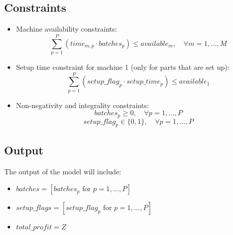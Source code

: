 \documentclass{article}
\begin{document}
\subsection*{Constraints}

\begin{itemize}
    \item Machine availability constraints:
    \[
    \sum_{p=1}^{P} (time_{m,p} \cdot batches_{p}) \leq available_{m}, \quad \forall m = 1, \ldots, M
    \]
    
    \item Setup time constraint for machine 1 (only for parts that are set up):
    \[
    \sum_{p=1}^{P} (setup\_flag_{p} \cdot setup\_time_{p}) \leq available_{1}
    \]

    \item Non-negativity and integrality constraints:
    \[
    batches_{p} \geq 0, \quad \forall p = 1, \ldots, P
    \]
    \[
    setup\_flag_{p} \in \{0, 1\}, \quad \forall p = 1, \ldots, P
    \]
\end{itemize}

\subsection*{Output}
The output of the model will include:
\begin{itemize}
    \item \( batches = [batches_{p} \text{ for } p = 1, \ldots, P] \)
    \item \( setup\_flags = [setup\_flag_{p} \text{ for } p = 1, \ldots, P] \)
    \item \( total\_profit = Z \)
\end{itemize}
\end{document}
